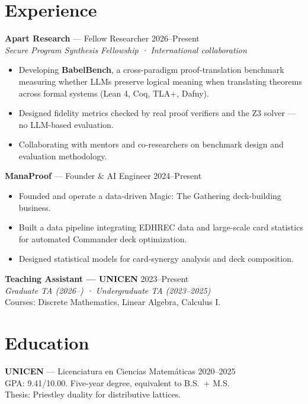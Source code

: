 \documentclass[11pt,a4paper]{article}
\begin{document}
\section{Experience}

\textbf{Apart Research} --- Fellow Researcher \hfill 2026--Present\\
\textit{Secure Program Synthesis Fellowship · International collaboration}

\begin{itemize}
  \item Developing \textbf{BabelBench}, a cross-paradigm proof-translation benchmark measuring whether LLMs preserve logical meaning when translating theorems across formal systems (Lean 4, Coq, TLA+, Dafny).
  \item Designed fidelity metrics checked by real proof verifiers and the Z3 solver --- no LLM-based evaluation.
  \item Collaborating with mentors and co-researchers on benchmark design and evaluation methodology.
\end{itemize}

\vspace{0.3em}
\textbf{ManaProof} --- Founder \& AI Engineer \hfill 2024--Present

\begin{itemize}
  \item Founded and operate a data-driven Magic: The Gathering deck-building business.
  \item Built a data pipeline integrating EDHREC data and large-scale card statistics for automated Commander deck optimization.
  \item Designed statistical models for card-synergy analysis and deck composition.
\end{itemize}

\vspace{0.3em}
\textbf{Teaching Assistant --- UNICEN} \hfill 2023--Present\\
\textit{Graduate TA (2026--) · Undergraduate TA (2023--2025)}\\
Courses: Discrete Mathematics, Linear Algebra, Calculus I.

\section{Education}

\textbf{UNICEN} --- Licenciatura en Ciencias Matemáticas \hfill 2020--2025\\
GPA: 9.41/10.00. Five-year degree, equivalent to B.S.\ + M.S.\\
Thesis: Priestley duality for distributive lattices.
\end{document}
